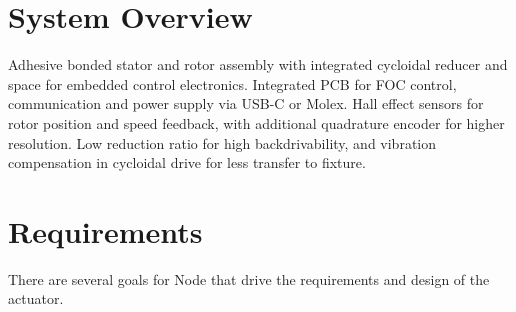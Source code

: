 \documentclass[confidential]{../../../classes/nervtech-engdoc}
\begin{document}
\maketitle
\tableofcontents
\newpage

\begin{revisionhistory}
\end{revisionhistory}

\section{System Overview}
\systemsummary
{Adhesive bonded stator and rotor assembly with integrated cycloidal reducer and space for embedded control electronics.}
{Integrated PCB for FOC control, communication and power supply via USB-C or Molex.}
{Hall effect sensors for rotor position and speed feedback, with additional quadrature encoder for higher resolution.}
{Low reduction ratio for high backdrivability, and vibration compensation in cycloidal drive for less transfer to fixture.}

\section{Requirements}
There are several goals for Node that drive the requirements and design of the actuator.
\end{document}
